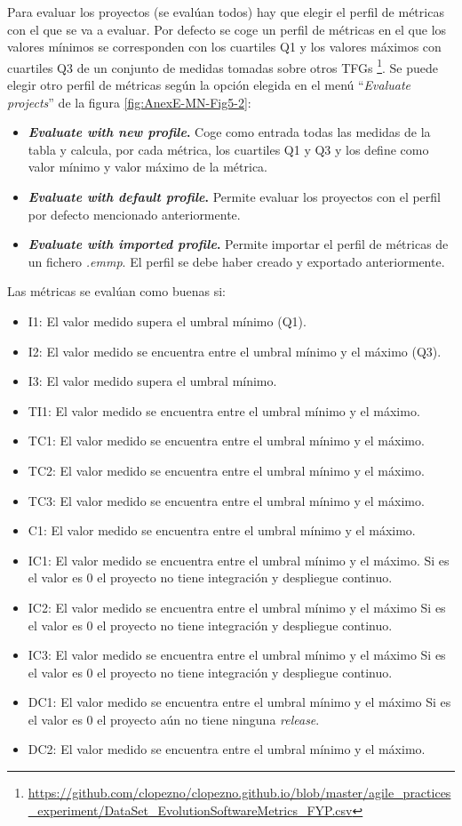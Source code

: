 Para evaluar los proyectos (se evalúan todos) hay que elegir el perfil de métricas con el que se va a evaluar. Por defecto se coge un perfil de métricas en el que los valores mínimos se corresponden con los cuartiles Q1 y los valores máximos con cuartiles Q3 de un conjunto de medidas tomadas sobre otros TFGs \footnote{\url{https://github.com/clopezno/clopezno.github.io/blob/master/agile_practices_experiment/DataSet_EvolutionSoftwareMetrics_FYP.csv}}. Se puede elegir otro perfil de métricas según la opción elegida en el menú ``\textit{Evaluate projects}'' de la figura \ref{fig:AnexE-MN-Fig5-2}:
\begin{itemize}
	\item \textbf{\textit{Evaluate with new profile}.} Coge como entrada todas las medidas de la tabla y calcula, por cada métrica, los cuartiles Q1 y Q3 y los define como valor mínimo y valor máximo de la métrica.
	\item \textbf{\textit{Evaluate with default profile}.} Permite evaluar los proyectos con el perfil por defecto mencionado anteriormente.
	\item \textbf{\textit{Evaluate with imported profile}.} Permite importar el perfil de métricas de un fichero \textit{.emmp}. El perfil se debe haber creado y exportado anteriormente.
\end{itemize}

Las métricas se evalúan como buenas si:
\begin{itemize}
	\item I1: El valor medido supera el umbral mínimo (Q1).
	\item I2: El valor medido se encuentra entre el umbral mínimo y el máximo (Q3).
	\item I3: El valor medido supera el umbral mínimo.
	\item TI1: El valor medido se encuentra entre el umbral mínimo y el máximo.
	\item TC1: El valor medido se encuentra entre el umbral mínimo y el máximo.
	\item TC2: El valor medido se encuentra entre el umbral mínimo y el máximo.
	\item TC3: El valor medido se encuentra entre el umbral mínimo y el máximo.
	\item C1: El valor medido se encuentra entre el umbral mínimo y el máximo.
	\item IC1: El valor medido se encuentra entre el umbral mínimo y el máximo. Si es el valor es 0 el proyecto no tiene integración y despliegue continuo.
	\item IC2: El valor medido se encuentra entre el umbral mínimo y el máximo Si es el valor es 0 el proyecto no tiene integración y despliegue continuo.
	\item IC3: El valor medido se encuentra entre el umbral mínimo y el máximo Si es el valor es 0 el proyecto no tiene integración y despliegue continuo.
	\item DC1: El valor medido se encuentra entre el umbral mínimo y el máximo Si es el valor es 0 el proyecto aún no tiene ninguna \textit{release}.
	\item DC2: El valor medido se encuentra entre el umbral mínimo y el máximo.
\end{itemize}

